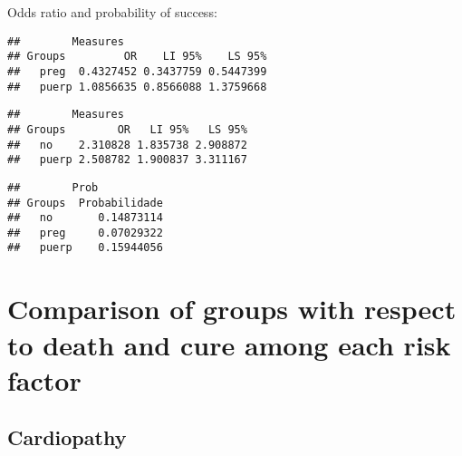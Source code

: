 \documentclass[
]{article}
\newenvironment{Shaded}{\begin{snugshade}}{\end{snugshade}}
\newcommand{\CommentTok}[1]{\textcolor[rgb]{0.56,0.35,0.01}{\textit{#1}}}
\newcommand{\KeywordTok}[1]{\textcolor[rgb]{0.13,0.29,0.53}{\textbf{#1}}}
\newcommand{\NormalTok}[1]{#1}
\newcommand{\OperatorTok}[1]{\textcolor[rgb]{0.81,0.36,0.00}{\textbf{#1}}}
\begin{document}
Odds ratio and probability of success:

\begin{Shaded}
\end{Shaded}

\begin{verbatim}
##        Measures
## Groups         OR    LI 95%    LS 95%
##   preg  0.4327452 0.3437759 0.5447399
##   puerp 1.0856635 0.8566088 1.3759668
\end{verbatim}

\begin{Shaded}
\end{Shaded}

\begin{verbatim}
##        Measures
## Groups        OR   LI 95%   LS 95%
##   no    2.310828 1.835738 2.908872
##   puerp 2.508782 1.900837 3.311167
\end{verbatim}

\begin{Shaded}
\end{Shaded}

\begin{verbatim}
##        Prob
## Groups  Probabilidade
##   no       0.14873114
##   preg     0.07029322
##   puerp    0.15944056
\end{verbatim}

\hypertarget{comparison-of-groups-with-respect-to-death-and-cure-among-each-risk-factor}{%
\section{Comparison of groups with respect to death and cure among each
risk
factor}\label{comparison-of-groups-with-respect-to-death-and-cure-among-each-risk-factor}}

\hypertarget{cardiopathy}{%
\subsection{Cardiopathy}\label{cardiopathy}}
\end{document}
